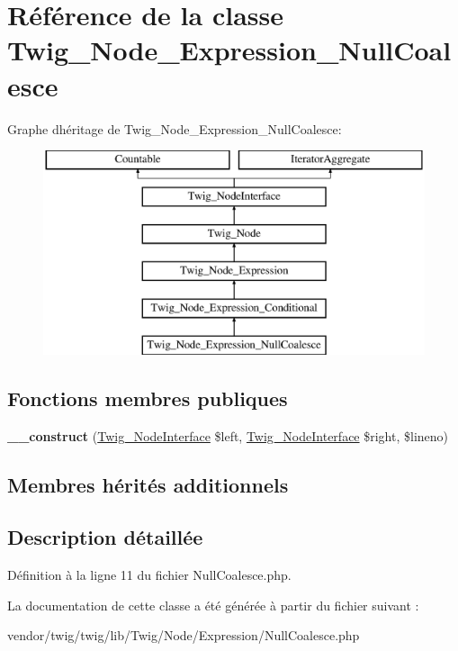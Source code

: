\hypertarget{class_twig___node___expression___null_coalesce}{}\section{Référence de la classe Twig\+\_\+\+Node\+\_\+\+Expression\+\_\+\+Null\+Coalesce}
\label{class_twig___node___expression___null_coalesce}
Graphe d\textquotesingle{}héritage de Twig\+\_\+\+Node\+\_\+\+Expression\+\_\+\+Null\+Coalesce\+:\begin{figure}[H]
\begin{center}
\leavevmode
\includegraphics[height=6.000000cm]{class_twig___node___expression___null_coalesce}
\end{center}
\end{figure}
\subsection*{Fonctions membres publiques}
\begin{DoxyCompactItemize}
\item 
{\bfseries \+\_\+\+\_\+construct} (\hyperlink{interface_twig___node_interface}{Twig\+\_\+\+Node\+Interface} \$left, \hyperlink{interface_twig___node_interface}{Twig\+\_\+\+Node\+Interface} \$right, \$lineno)\hypertarget{class_twig___node___expression___null_coalesce_a188d713363d22fc94efa0d14cf6b588c}{}\label{class_twig___node___expression___null_coalesce_a188d713363d22fc94efa0d14cf6b588c}

\end{DoxyCompactItemize}
\subsection*{Membres hérités additionnels}


\subsection{Description détaillée}


Définition à la ligne 11 du fichier Null\+Coalesce.\+php.



La documentation de cette classe a été générée à partir du fichier suivant \+:\begin{DoxyCompactItemize}
\item 
vendor/twig/twig/lib/\+Twig/\+Node/\+Expression/Null\+Coalesce.\+php\end{DoxyCompactItemize}
